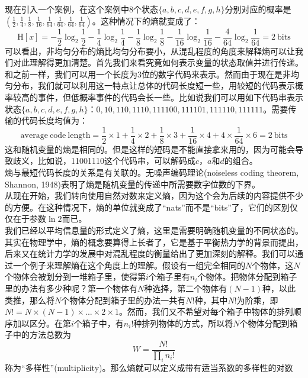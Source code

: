 \documentclass[b5paper]{book}
\numberwithin{equation}{chapter}
\begin{document}
{	现在引入一个案例，在这个案例中8个状态$\{a,b,c,d,e,f,g,h\}$分别对应的概率是$(\frac{1}{2},\frac{1}{4},\frac{1}{8},\frac{1}{16},\frac{1}{64},\frac{1}{64},\frac{1}{64},\frac{1}{64})$。这种情况下的熵就变成了：
		\[ \mathrm{H}[x]=-\frac{1}{2}\log_2 \frac{1}{2} - \frac{1}{4}\log_2 \frac{1}{4} - \frac{1}{8}\log_2 \frac{1}{8} - \frac{1}{16}\log_2 \frac{1}{16} -\frac{4}{64}\log_2 \frac{1}{64} = 2\ \mathrm{bits} \]
	可以看出，非均匀分布的熵比均匀分布要小，从混乱程度的角度来解释熵可以让我们对此理解得更加清楚。首先我们来看究竟如何表示变量的状态取值并进行传递。和之前一样，我们可以用一个长度为3位的数字代码来表示。然而由于现在是非均匀分布，我们就可以利用这一特点让总体的代码长度短一些，用较短的代码表示概率较高的事件，但低概率事件的代码会长一些。比如说我们可以用如下代码串表示状态$\{a,b,c,d,e,f,g,h\}$：$0,10,110,1110,111100,111101,111110,111111$。需要传输的代码长度均值为：
	\[ \mathrm{average\ code\ length} = \frac{1}{2} \times 1 + \frac{1}{4} \times 2 + \frac{1}{8} \times 3 + \frac{1}{16} \times 4 + 4 \times \frac{1}{64} \times 6 = 2\ \mathrm{bits}\]
	这和随机变量的熵是相同的。但是这样的短码是不能直接拿来用的，因为可能会导致歧义，比如说，11001110这个代码串，可以解码成$c$，$a$和$d$的组合。\\
	\indent 熵与最短代码长度的关系是有关联的。无噪声编码理论(noiseless coding theorem, Shannon, 1948)表明了熵是随机变量的传递中所需要数字位数的下界。\\
	\indent 从现在开始，我们转向使用自然对数来定义熵，因为这个会为后续的内容提供不少的方便。在这种情况下，熵的单位就变成了“nats”而不是“bits”了，它们的区别仅仅在于参数$\ln 2$而已。\\
	\indent 我们已经以平均信息量的形式定义了熵，这里是需要明确随机变量的不同状态的。其实在物理学中，熵的概念要算得上长者了，它是基于平衡热力学的背景而提出，后来又在统计力学的发展中对混乱程度的衡量给出了更加深刻的解释。我们可以通过一个例子来理解熵在这个角度上的理解。假设有一组完全相同的$N$个物体，这$N$个物体会被划分到一堆箱子里，使得第$i$个箱子里有$n_i$个物体。把物体分配到箱子里的办法有多少种呢？第一个物体有$N$种选择，第二个物体有$(N-1)$种，以此类推，那么将$N$个物体分配到箱子里的办法一共有$N!$种，其中$N!$为阶乘，即$N! = N \times (N-1) \times ... \times 2 \times 1$。然而，我们又不希望对每个箱子中物体的排列顺序加以区分。在第$i$个箱子中，有$n_i!$种排列物体的方式，所以将$N$个物体分配到箱子中的方法总数为
	\begin{equation}
		W=\frac{N!}{\prod_i n_i !}
	\end{equation}
	称为“多样性”(multiplicity)。那么熵就可以定义成带有适当系数的多样性的对数
	\begin{equation}

\end{equation}}
\end{document}
